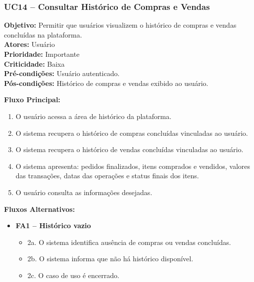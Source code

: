 ﻿\documentclass[12pt,a4paper]{article}
\begin{document}

\subsubsection{UC14 – Consultar Histórico de Compras e Vendas}
\label{uc:14}
\noindent\textbf{Objetivo:} Permitir que usuários visualizem o histórico de compras e vendas concluídas na plataforma.\\
\textbf{Atores:} Usuário\\
\textbf{Prioridade:} Importante\\
\textbf{Criticidade:} Baixa\\
\textbf{Pré-condições:} Usuário autenticado.\\
\textbf{Pós-condições:} Histórico de compras e vendas exibido ao usuário.

\vspace{0.5em}
\noindent\textbf{Fluxo Principal:}
\begin{enumerate}[label=\arabic*.]
    \item O usuário acessa a área de histórico da plataforma.
    \item O sistema recupera o histórico de compras concluídas vinculadas ao usuário.
    \item O sistema recupera o histórico de vendas concluídas vinculadas ao usuário.
    \item O sistema apresenta: pedidos finalizados, itens comprados e vendidos, valores das transações, datas das operações e status finais dos itens.
    \item O usuário consulta as informações desejadas.
\end{enumerate}

\vspace{0.5em}
\noindent\textbf{Fluxos Alternativos:}
\begin{itemize}[leftmargin=*]
    \item \textbf{FA1 – Histórico vazio}
    \begin{itemize}[label={}, leftmargin=0.5cm]
        \item 2a. O sistema identifica ausência de compras ou vendas concluídas.
        \item 2b. O sistema informa que não há histórico disponível.
        \item 2c. O caso de uso é encerrado.
    \end{itemize}
\end{itemize}
\end{document}
